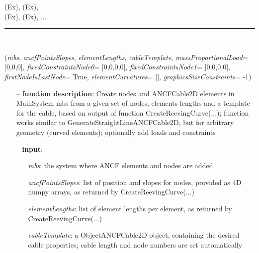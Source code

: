 \begin{itemize}[leftmargin=1.4cm]
\begin{itemize}[leftmargin=1.4cm]
\begin{itemize}[leftmargin=1.4cm]
\begin{itemize}[leftmargin=0.5cm]
\begin{itemize}[leftmargin=1.4cm]
 (Ex), 
 (Ex), 
\\  (Ex), 
 (Ex), 
 ...

\ei

%
\noindent\rule{8cm}{0.75pt}\vspace{1pt} \\ 
\begin{flushleft}
\label{sec:beams:PointsAndSlopes2ANCFCable2D}
({\it mbs}, {\it ancfPointsSlopes}, {\it elementLengths}, {\it cableTemplate}, {\it massProportionalLoad}= [0,0,0], {\it fixedConstraintsNode0}= [0,0,0,0], {\it fixedConstraintsNode1}= [0,0,0,0], {\it firstNodeIsLastNode}= True, {\it elementCurvatures}= [], {\it graphicsSizeConstraints}= -1)
\end{flushleft}
\setlength{\itemindent}{0.7cm}
\begin{itemize}[leftmargin=0.7cm]
\item[--]
{\bf function description}: Create nodes and ANCFCable2D elements in MainSystem mbs from a given set of nodes, elements lengths and a template for the cable, based on output of function CreateReevingCurve(...); function works similar to GenerateStraightLineANCFCable2D, but for arbitrary geometry (curved elements); optionally add loads and constraints
\item[--]
{\bf input}: \vspace{-6pt}
\begin{itemize}[leftmargin=1.2cm]
\setlength{\itemindent}{-0.7cm}
\item[]{\it mbs}: the system where ANCF elements and nodes are added
\item[]{\it ancfPointsSlopes}: list of position and slopes for nodes, provided as 4D numpy arrays, as returned by CreateReevingCurve(...)
\item[]{\it elementLengths}: list of element lengths per element, as returned by CreateReevingCurve(...)
\item[]{\it cableTemplate}: a ObjectANCFCable2D object, containing the desired cable properties; cable length and node numbers are set automatically

\end{itemize}
\end{itemize}
\end{itemize}
\end{itemize}
\end{itemize}
\end{itemize}
\end{itemize}
